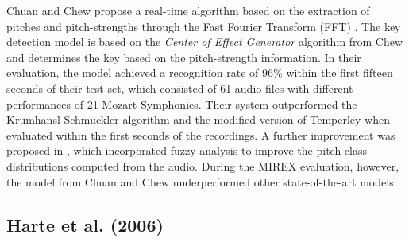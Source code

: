
Chuan and Chew propose a real-time algorithm based on the extraction of pitches and pitch-strengths through the Fast Fourier Transform (FFT) \cite{chuan_polyphonic_2005}. The key detection model is based on the \emph{Center of Effect Generator} algorithm from Chew \cite{chew_spiral_2002} and determines the key based on the pitch-strength information. In their evaluation, the model achieved a recognition rate of 96\% within the first fifteen seconds of their test set, which consisted of 61 audio files with different performances of 21 Mozart Symphonies. Their system outperformed the Krumhansl-Schmuckler algorithm and the modified version of Temperley when evaluated within the first seconds of the recordings. A further improvement was proposed in \cite{chuan_fuzzy_2005}, which incorporated fuzzy analysis to improve the pitch-class distributions computed from the audio. During the MIREX evaluation, however, the model from Chuan and Chew underperformed other state-of-the-art models.


\subsection{Harte et al. (2006)}

